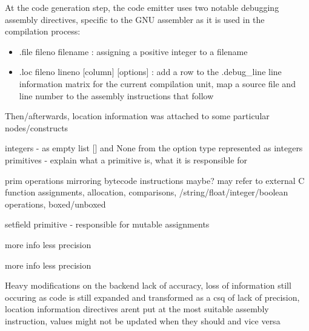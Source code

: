 At the code generation step, the code emitter uses two notable debugging
assembly directives, specific to the GNU assembler as it is used in the
compilation process:


\begin{itemize}
    \item .file fileno filename : assigning a positive integer to a filename
    \item .loc fileno lineno [column] [options] : add a row to the .debug\_line
        line information matrix for the current compilation unit, map a source
        file and line number to the assembly instructions that follow

\end{itemize}


Then/afterwards, location information was attached to some particular nodes/constructs

integers - as empty list [] and None from the option type represented as integers
primitives - explain what a primitive is, what it is responsible for

prim operations mirroring bytecode instructions maybe?
may refer to external C function
assignments, allocation, comparisons, /string/float/integer/boolean operations,
boxed/unboxed

setfield primitive - responsible for mutable assignments

\begin{description}
\pro more info
\con less precision
\end{description}

\begin{itemize}
\tick more info
\fail less precision
\end{itemize}

Heavy modifications on the backend
lack of accuracy, loss of information still occuring as code is still expanded and transformed
as a csq of lack of precision, location information directives arent put at the
most suitable assembly instruction, values might not be updated when they should
and vice versa

